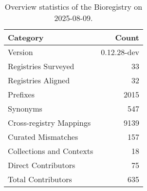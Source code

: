 \begin{table}
\caption{Overview statistics of the Bioregistry on 2025-08-09.}
\label{tab:bioregistry-summary}
\begin{tabular}{lr}
\toprule
Category & Count \\
\midrule
Version & 0.12.28-dev \\
Registries Surveyed & 33 \\
Registries Aligned & 32 \\
Prefixes & 2015 \\
Synonyms & 547 \\
Cross-registry Mappings & 9139 \\
Curated Mismatches & 157 \\
Collections and Contexts & 18 \\
Direct Contributors & 75 \\
Total Contributors & 635 \\
\bottomrule
\end{tabular}
\end{table}
